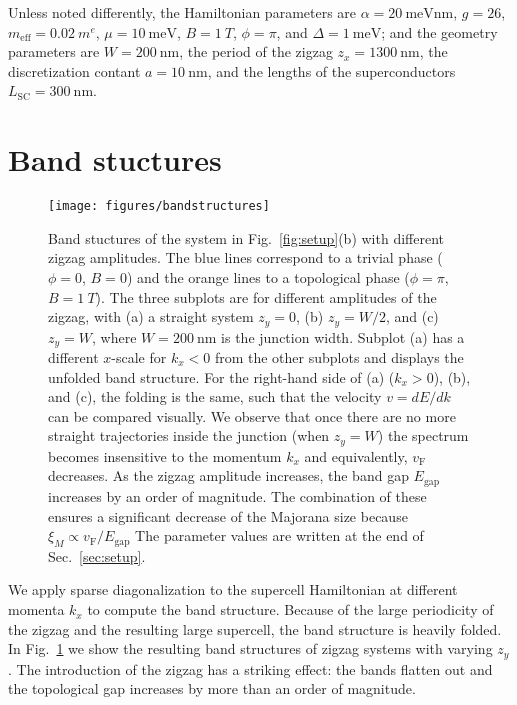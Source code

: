 \documentclass[english, twocolumn, 10pt, aps, superscriptaddress, floatfix, prb, citeautoscript]{revtex4-1}
\newcommand{\meff}{m_\text{eff}}
\renewcommand{\comment}[2]{#2}
\begin{document}
\comment{The default parameters are ...}
Unless noted differently, the Hamiltonian parameters are $\alpha=\SI{20}{\meV \nm}$, $g=26$, $\meff=\SI{0.02}{\electronmass}$, $\mu=\SI{10}{\meV}$, $B=\SI{1}{T}$, $\phi=\pi$, and $\Delta=\SI{1}{\meV}$; and the geometry parameters are $W=\SI{200}{\nm}$, the period of the zigzag $z_x=\SI{1300}{\nm}$, the discretization contant $a=\SI{10}{\nm}$, and the lengths of the superconductors $L_\textrm{SC}=\SI{300}{\nm}$.


\section{Band stuctures}\label{sec:band_structures}

\begin{figure}[!htb]
\texttt{[image: figures/bandstructures]}
\caption{Band stuctures of the system in Fig.~\ref{fig:setup}(b) with different zigzag amplitudes.
The blue lines correspond to a trivial phase ($\phi=0$, $B=0$) and the orange lines to a topological phase ($\phi=\pi$, $B = \SI{1}{T}$).
The three subplots are for different amplitudes of the zigzag, with (a) a straight system $z_y=0$, (b) $z_y=W/2$, and (c) $z_y=W$, where $W=\SI{200}{\nm}$ is the junction width.
Subplot (a) has a different $x$-scale for $k_x < 0$ from the other subplots and displays the unfolded band structure.
For the right-hand side of (a) ($k_x > 0$), (b), and (c), the folding is the same, such that the velocity $v=dE/dk$ can be compared visually.
We observe that once there are no more straight trajectories inside the junction (when $z_y=W$) the spectrum becomes insensitive to the momentum $k_x$ and equivalently, $v_\textrm{F}$ decreases.
As the zigzag amplitude increases, the band gap $E_\textrm{gap}$ increases by an order of magnitude.
The combination of these ensures a significant decrease of the Majorana size because $\xi_M \propto v_\textrm{F}/E_\textrm{gap}$
The parameter values are written at the end of Sec.~\ref{sec:setup}.\label{fig:band_structures}}
\end{figure}

\comment{We calculate the band structure for varying amount of zigzag.}
We apply sparse diagonalization to the supercell Hamiltonian at different momenta $k_x$ to compute the band structure.
Because of the large periodicity of the zigzag and the resulting large supercell, the band structure is heavily folded.
In Fig.~\ref{fig:band_structures} we show the resulting band structures of zigzag systems with varying $z_y$.
The introduction of the zigzag has a striking effect: the bands flatten out and the topological gap increases by more than an order of magnitude.
\end{document}
